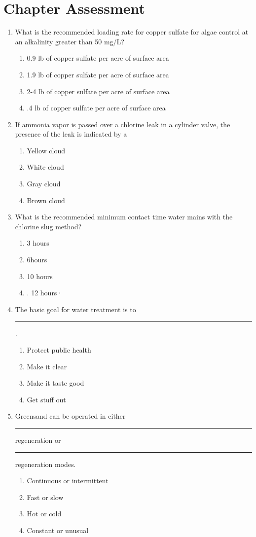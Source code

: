 \chapter*{Chapter Assessment}
\begin{enumerate}
\item What is the recommended loading rate for copper sulfate for algae control at an alkalinity greater than 50 mg/L?
\begin{enumerate}
\item 0.9 lb of copper sulfate per acre of surface area
\item 1.9 lb of copper sulfate per acre of surface area
\item 2-4 lb of copper sulfate per acre of surface area
\item.4 lb of copper sulfate per acre of surface area
\end{enumerate}

\item If ammonia vapor is passed over a chlorine leak in a cylinder valve, the presence of the leak is indicated by a
\begin{enumerate}
\item Yellow cloud
\item White cloud
\item Gray cloud
\item Brown cloud
\end{enumerate}

\item What is the recommended minimum contact time water mains with the chlorine slug method?
\begin{enumerate}
\item 3 hours
\item 6hours
\item 10 hours
\item. 12 hours·
\end{enumerate}

\item The basic goal for water treatment is to \rule{2cm}{0.3pt}.
\begin{enumerate}
\item Protect public health
\item Make it clear
\item Make it taste good
\item Get stuff out
\end{enumerate}

\item Greensand can be operated in either \rule{2cm}{0.5pt} regeneration or \rule{2cm}{0.5pt} regeneration modes.
\begin{enumerate}
\item Continuous or intermittent
\item Fast or slow
\item Hot or cold
\item Constant or unusual
\end{enumerate}


\end{enumerate}
